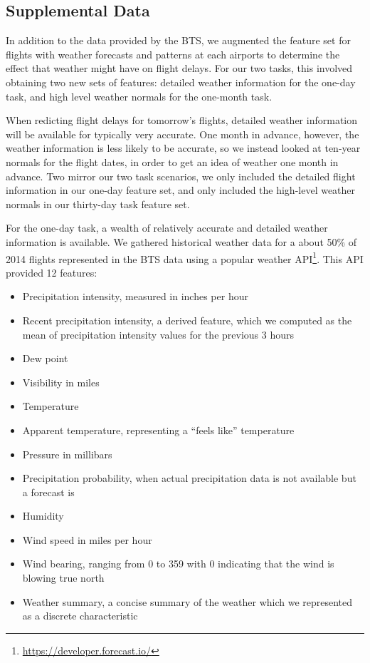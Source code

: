 \documentclass[twocolumn]{article}
\begin{document}
\subsection{Supplemental Data}

In addition to the data provided by the BTS, we augmented the feature set for flights with weather forecasts and patterns at each airports to determine the effect that weather might have on flight delays.
For our two tasks, this involved obtaining two new sets of features: detailed weather information for the one-day task, and high level weather normals for the one-month task.

When redicting flight delays for tomorrow's flights, detailed weather information will be available for typically very accurate.
One month in advance, however, the weather information is less likely to be accurate, so we instead looked at ten-year normals for the flight dates, in order to get an idea of weather one month in advance.
Two mirror our two task scenarios, we only included the detailed flight information in our one-day feature set, and only included the high-level weather normals in our thirty-day task feature set.

For the one-day task, a wealth of relatively accurate and detailed weather information is available. We gathered historical weather data for a about 50\% of 2014 flights represented in the BTS data using a popular weather API\footnote{\url{https://developer.forecast.io/}}. This API provided 12 features:
\begin{itemize}
\item Precipitation intensity, measured in inches per hour
\item Recent precipitation intensity, a derived feature, which we computed as the mean of precipitation intensity values for the previous 3 hours
\item Dew point
\item Visibility in miles
\item Temperature
\item Apparent temperature, representing a ``feels like'' temperature
\item Pressure in millibars
\item Precipitation probability, when actual precipitation data is not available but a forecast is
\item Humidity
\item Wind speed in miles per hour
\item Wind bearing, ranging from 0 to 359 with 0 indicating that the wind is blowing true north
\item Weather summary, a concise summary of the weather which we represented as a discrete characteristic
\end{itemize}
\end{document}
